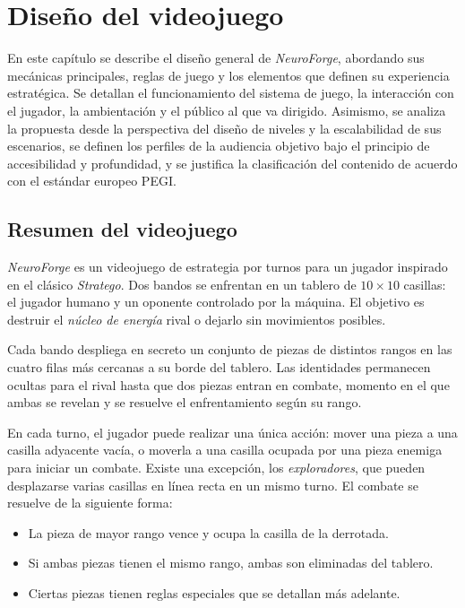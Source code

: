 \chapter{Diseño del videojuego}

En este capítulo se describe el diseño general de \textit{NeuroForge}, abordando sus mecánicas principales, reglas de juego y los elementos que definen su experiencia estratégica. Se detallan el funcionamiento del sistema de juego, la interacción con el jugador, la ambientación y el público al que va dirigido. Asimismo, se analiza la propuesta desde la perspectiva del diseño de niveles y la escalabilidad de sus escenarios, se definen los perfiles de la audiencia objetivo bajo el principio de accesibilidad y profundidad, y se justifica la clasificación del contenido de acuerdo con el estándar europeo PEGI.

\section{Resumen del videojuego}

\textit{NeuroForge} es un videojuego de estrategia por turnos para un jugador inspirado en el clásico \textit{Stratego}. Dos bandos se enfrentan en un tablero de $10 \times 10$ casillas: el jugador humano y un oponente controlado por la máquina. El objetivo es destruir el \textit{núcleo de energía} rival o dejarlo sin movimientos posibles.

Cada bando despliega en secreto un conjunto de piezas de distintos rangos en las cuatro filas más cercanas a su borde del tablero. Las identidades permanecen ocultas para el rival hasta que dos piezas entran en combate, momento en el que ambas se revelan y se resuelve el enfrentamiento según su rango.

En cada turno, el jugador puede realizar una única acción: mover una pieza a una casilla adyacente vacía, o moverla a una casilla ocupada por una pieza enemiga para iniciar un combate. Existe una excepción, los \textit{exploradores}, que pueden desplazarse varias casillas en línea recta en un mismo turno. El combate se resuelve de la siguiente forma:

\begin{itemize}
	\item La pieza de mayor rango vence y ocupa la casilla de la derrotada.
	\item Si ambas piezas tienen el mismo rango, ambas son eliminadas del tablero.
	\item Ciertas piezas tienen reglas especiales que se detallan más adelante.
\end{itemize}

